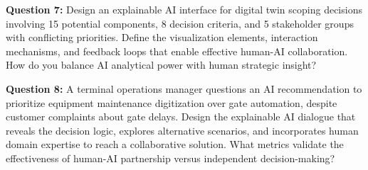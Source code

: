 \documentclass{article}
\begin{document}
\textbf{Question 7:} Design an explainable AI interface for digital twin scoping decisions involving 15 potential components, 8 decision criteria, and 5 stakeholder groups with conflicting priorities. Define the visualization elements, interaction mechanisms, and feedback loops that enable effective human-AI collaboration. How do you balance AI analytical power with human strategic insight?

\textbf{Question 8:} A terminal operations manager questions an AI recommendation to prioritize equipment maintenance digitization over gate automation, despite customer complaints about gate delays. Design the explainable AI dialogue that reveals the decision logic, explores alternative scenarios, and incorporates human domain expertise to reach a collaborative solution. What metrics validate the effectiveness of human-AI partnership versus independent decision-making?
\end{document}
